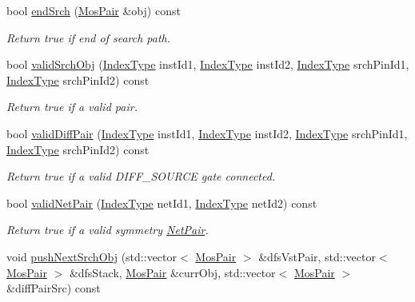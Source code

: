\begin{DoxyCompactItemize}
bool \hyperlink{classSymDetect_ac46824a93f71489b6c9f1aec961a0f8d}{end\+Srch} (\hyperlink{classMosPair}{Mos\+Pair} \&obj) const
\begin{DoxyCompactList}\small\item\em Return true if end of search path. \end{DoxyCompactList}\item 
bool \hyperlink{classSymDetect_ad4636f69ae0cad2fc23be2472c59ff4c}{valid\+Srch\+Obj} (\hyperlink{type_8h_a581e8093e28e7362f2b6937296190676}{Index\+Type} inst\+Id1, \hyperlink{type_8h_a581e8093e28e7362f2b6937296190676}{Index\+Type} inst\+Id2, \hyperlink{type_8h_a581e8093e28e7362f2b6937296190676}{Index\+Type} srch\+Pin\+Id1, \hyperlink{type_8h_a581e8093e28e7362f2b6937296190676}{Index\+Type} srch\+Pin\+Id2) const
\begin{DoxyCompactList}\small\item\em Return true if a valid pair. \end{DoxyCompactList}\item 
bool \hyperlink{classSymDetect_a1153c5f98df1f6dde97ed3335367bb66}{valid\+Diff\+Pair} (\hyperlink{type_8h_a581e8093e28e7362f2b6937296190676}{Index\+Type} inst\+Id1, \hyperlink{type_8h_a581e8093e28e7362f2b6937296190676}{Index\+Type} inst\+Id2, \hyperlink{type_8h_a581e8093e28e7362f2b6937296190676}{Index\+Type} srch\+Pin\+Id1, \hyperlink{type_8h_a581e8093e28e7362f2b6937296190676}{Index\+Type} srch\+Pin\+Id2) const
\begin{DoxyCompactList}\small\item\em Return true if a valid D\+I\+F\+F\+\_\+\+S\+O\+U\+R\+CE gate connected. \end{DoxyCompactList}\item 
bool \hyperlink{classSymDetect_aee09c40b5606443e8aa9f30865dab600}{valid\+Net\+Pair} (\hyperlink{type_8h_a581e8093e28e7362f2b6937296190676}{Index\+Type} net\+Id1, \hyperlink{type_8h_a581e8093e28e7362f2b6937296190676}{Index\+Type} net\+Id2) const
\begin{DoxyCompactList}\small\item\em Return true if a valid symmetry \hyperlink{classNetPair}{Net\+Pair}. \end{DoxyCompactList}\item 
void \hyperlink{classSymDetect_a7f4cd1010a21da88d35abb89c6f33f00}{push\+Next\+Srch\+Obj} (std\+::vector$<$ \hyperlink{classMosPair}{Mos\+Pair} $>$ \&dfs\+Vst\+Pair, std\+::vector$<$ \hyperlink{classMosPair}{Mos\+Pair} $>$ \&dfs\+Stack, \hyperlink{classMosPair}{Mos\+Pair} \&curr\+Obj, std\+::vector$<$ \hyperlink{classMosPair}{Mos\+Pair} $>$ \&diff\+Pair\+Src) const

\end{DoxyCompactItemize}
